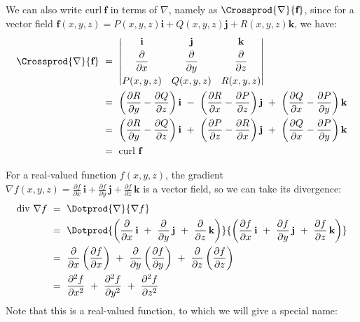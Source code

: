 We can also write $\text{curl}~\textbf{f}$ in terms of $\nabla$, namely as $\Crossprod{\nabla}{\textbf{f}}$, since
for a vector field $\textbf{f}(x,y,z) = P(x,y,z)\textbf{i} + Q(x,y,z)\textbf{j} + R(x,y,z)\textbf{k}$, we have:
\begin{align*}
 \Crossprod{\nabla}{\textbf{f}} ~&=~
 \begin{vmatrix}
  \textbf{i} & \textbf{j} & \textbf{k} \vspace{1mm}\\ \dfrac{\partial}{\partial x} & \dfrac{\partial}{\partial y} &
   \dfrac{\partial}{\partial z} \vspace{1mm}\\
  P(x,y,z) & Q(x,y,z) & R(x,y,z)
 \end{vmatrix}\\
 &=~ \left( \frac{\partial R}{\partial y} - \frac{\partial Q}{\partial z} \right) \textbf{i} ~-~
    \left( \frac{\partial R}{\partial x} - \frac{\partial P}{\partial z} \right) \textbf{j} ~+~
    \left( \frac{\partial Q}{\partial x} - \frac{\partial P}{\partial y} \right) \textbf{k}\\
 &=~ \left( \frac{\partial R}{\partial y} - \frac{\partial Q}{\partial z} \right) \textbf{i} ~+~
    \left( \frac{\partial P}{\partial z} - \frac{\partial R}{\partial x} \right) \textbf{j} ~+~
    \left( \frac{\partial Q}{\partial x} - \frac{\partial P}{\partial y} \right) \textbf{k}\\
 &=~ \text{curl}~\textbf{f}
\end{align*}

For a real-valued function $f(x,y,z)$, the gradient $\nabla f(x,y,z) =\frac{\partial f}{\partial x}\,\textbf{i} +
\frac{\partial f}{\partial y}\,\textbf{j} + \frac{\partial f}{\partial z}\,\textbf{k}$ is a vector field, so we
can take its divergence:
\begin{align*}
 \text{div}~\nabla f ~&=~ \Dotprod{\nabla}{\nabla f}\\
  &=~ \Dotprod{ \left( \frac{\partial}{\partial x}\,\textbf{i} ~+~ \frac{\partial}{\partial y}\,\textbf{j} ~+~
  \frac{\partial}{\partial z}\,\textbf{k} \right) }{\left( \frac{\partial f}{\partial x}\,\textbf{i} ~+~
  \frac{\partial f}{\partial y}\,\textbf{j} ~+~ \frac{\partial f}{\partial z}\,\textbf{k} \right) }\\
  &=~ \frac{\partial}{\partial x}\left( \frac{\partial f}{\partial x} \right) ~+~
   \frac{\partial}{\partial y}\left( \frac{\partial f}{\partial y} \right) ~+~
   \frac{\partial}{\partial z}\left( \frac{\partial f}{\partial z} \right)\\
  &=~ \frac{\partial^2 f}{\partial x^2} ~+~ \frac{\partial^2 f}{\partial y^2} ~+~ \frac{\partial^2 f}{\partial z^2}
\end{align*}
Note that this is a real-valued function, to which we will give a special name:

